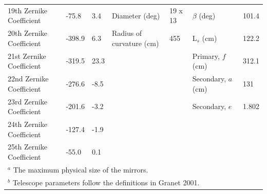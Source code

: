 \documentclass[]{spie}  %
\begin{document}
\begin{table}[ht]
\begin{adjustbox}{width=1.05\textwidth}
\begin{tabular}{|l|llll||ll|}
19th Zernike Coefficient  & -75.8             & 3.4               & Diameter (deg)            & 19 x 13  & $\beta$  (deg)                 & 101.4 \\   
20th Zernike Coefficient  & -398.9            & 6.3               & Radius of curvature (cm)  & 455      & L$_s$ (cm)                     & 122.2 \\   
21st Zernike Coefficient  & -319.5            & 23.3              &                           &          & Primary, $f$ (cm)              & 312.1 \\   
22nd Zernike Coefficient  & -276.6            & -8.5              &                           &          & Secondary, $a$ (cm)            & 131   \\   
23rd Zernike Coefficient  & -201.6            & -3.2              &                           &          & Secondary, $e$                 &  1.802  \\
24th Zernike Coefficient  & -127.4            & -1.9              &                           &          &                                &       \\
25th Zernike Coefficient  & -55.0             & 0.1               &                           &          &                                &       \\\hline
\multicolumn{7}{l}{\footnotesize  $^a$ The maximum physical size of the mirrors.}\\
\multicolumn{7}{l}{\footnotesize  $^b$ Telescope parameters follow the definitions in Granet 2001.\cite{granet2001}} \\
\end{tabular}
\end{adjustbox}
\end{table}
\end{document}

